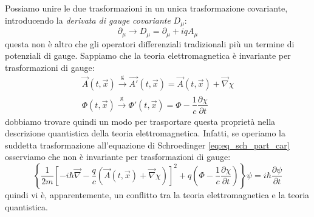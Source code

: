 Possiamo unire le due trasformazioni in un unica trasformazione covariante, introducendo la \textit{derivata di gauge covariante} $D_\mu$:
\begin{equation}
     \partial_\mu \xrightarrow{} D_\mu=\partial_\mu+iqA_\mu
\end{equation}
questa non è altro che gli operatori differenziali tradizionali più un termine di potenziali di gauge.
Sappiamo che la teoria elettromagnetica è invariante per trasformazioni di gauge:
\begin{equation}
    \begin{gathered}
\Vec{A}(t,\Vec{x})
   \xrightarrow[\text{}]{\text{g}}
  \Vec{A'}(t,\Vec{x})
    =\Vec{A}(t,\Vec{x})
    +\Vec{\nabla}\chi\\
    \Phi(t,\Vec{x})
   \xrightarrow[\text{}]{\text{g}}
  \Phi'(t,\Vec{x})
    =\Phi
    -\dfrac{1}{c}\dfrac{\partial \chi}{\partial t}
 \end{gathered}
\end{equation}
dobbiamo trovare quindi un modo per trasportare questa proprietà nella descrizione quantistica della teoria elettromagnetica. Infatti, se operiamo la suddetta trasformazione all'equazione di Schroedinger \eqref{eq:eq_sch_part_car} osserviamo che non è invariante per trasformazioni di gauge:
\begin{equation}
     \left\{\dfrac{1}{2m}\left[-i\hbar\Vec{\nabla}-\dfrac{q}{c}\left(\Vec{A}(t,\Vec{x})
    +\Vec{\nabla}\chi\right)\right]^2+q\left(\Phi
    -\dfrac{1}{c}\dfrac{\partial \chi}{\partial t}\right)\right\}\psi=i\hbar\dfrac{\partial \psi}{\partial t}
\end{equation}
quindi vi è, apparentemente, un conflitto tra la teoria elettromagnetica e la teoria quantistica. 

